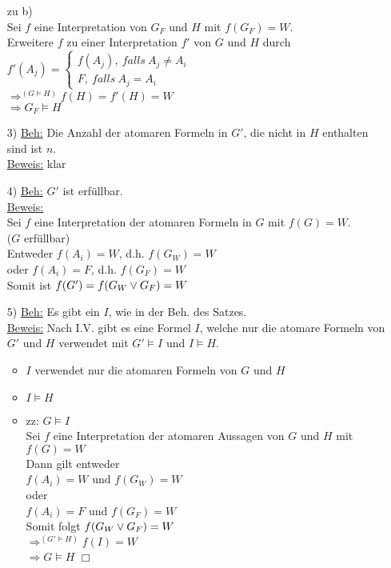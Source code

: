 \begin{enumerate}
zu b)\\
Sei $f$ eine Interpretation von $G_F$ und $H$ mit $f(G_F) = W$.\\
Erweitere $f$ zu einer Interpretation $f'$ von $G$ und $H$ durch\\
$f'(A_j) = \begin{cases} f(A_j),\ falls\ A_j \neq A_i \\ F,\ falls\ A_j = A_i \end{cases}$\\
$\Rightarrow^{(G \models H)} f(H) = f'(H) = W$\\
$\Rightarrow G_F \models H$

\item[3)] \underline{Beh:} Die Anzahl der atomaren Formeln in $G'$, die nicht in $H$ enthalten sind ist $n$.\\
\underline{Beweis:} klar

\item[4)] \underline{Beh:} $G'$ ist erfüllbar.\\
\underline{Beweis:}\\
Sei $f$ eine Interpretation der atomaren Formeln in $G$ mit $f(G) = W$.\\
($G$ erfüllbar)\\
Entweder $f(A_i) = W$, d.h. $f(G_W) = W$\\
oder $f(A_i) = F$, d.h. $f(G_F) = W$\\
Somit ist $f(G') = f(G_W \vee G_F) = W$

\item[5)] \underline{Beh:} Es gibt ein $I$, wie in der Beh. des Satzes.\\
\underline{Beweis:} Nach I.V. gibt es eine Formel $I$, welche nur die atomare Formeln von $G'$ und $H$ verwendet mit $G' \models I$ und $I \models H$.

\begin{itemize}
\item $I$ verwendet nur die atomaren Formeln von $G$ und $H$
\item $I \models H$ 
\item zz: $G \models I$\\
Sei $f$ eine Interpretation der atomaren Aussagen von $G$ und $H$ mit $f(G) = W$\\
Dann gilt entweder\\
$f(A_i) = W$ und $f(G_W) = W$\\
oder\\
$f(A_i) = F$ und $f(G_F) = W$\\
Somit folgt $f(G_W \vee G_F) = W$\\
$\Rightarrow^{(G' \models H)} f(I) = W$\\
$\Rightarrow G \models H$ $\Box$
\end{itemize}

\end{enumerate}

